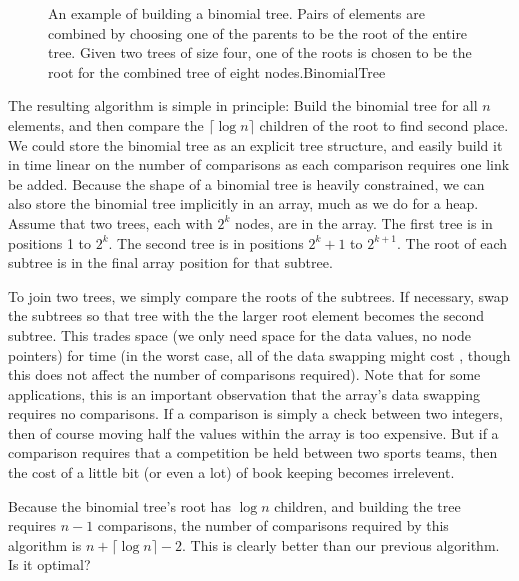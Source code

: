 \begin{figure}
{An example of building a binomial tree.
Pairs of elements are combined by choosing one of the parents to be
the root of the entire tree.
Given two trees of size four, one of the roots is chosen to be the
root for the combined tree of eight nodes.}{BinomialTree}
\bigskip
\end{figure}

The resulting algorithm is simple in principle:
Build the binomial tree for all \(n\) elements, and then compare the
\(\lceil \log n\rceil\) children of the root to find second place.
We could store the binomial tree as an explicit tree structure, and
easily build it in time linear on the number of comparisons as each
comparison requires one link be added.
Because the shape of a binomial tree is heavily constrained,
we can also store the binomial tree implicitly in an array, much as we
do for a heap.
Assume that two trees, each with \(2^k\) nodes, are in the array.
The first tree is in positions 1 to \(2^k\).
The second tree is in positions \(2^k+1\) to \(2^{k+1}\).
The root of each subtree is in the final array position for that
subtree.

To join two trees, we simply
compare the roots of the subtrees.
If necessary, swap the subtrees so that tree with the the larger root
element becomes the second subtree.
This trades space (we only need space for the data values, no node
pointers) for time (in the worst case, all of the data swapping might
cost \Onlogn, though this does not affect the number of comparisons
required).
Note that for some applications, this is an important observation that
the array's data swapping requires no comparisons.
If a comparison is simply a check between two integers, then of course
moving half the values within the array is too expensive.
But if a comparison requires that a competition be held between two
sports teams, then the cost of a little bit (or even a lot) of book
keeping becomes irrelevent.

Because the binomial tree's root has \(\log n\) children, and building
the tree requires \(n-1\) comparisons, the number of comparisons
required by this algorithm is \(n + \lceil \log n \rceil - 2\).
This is clearly better than our previous algorithm.
Is it optimal?

